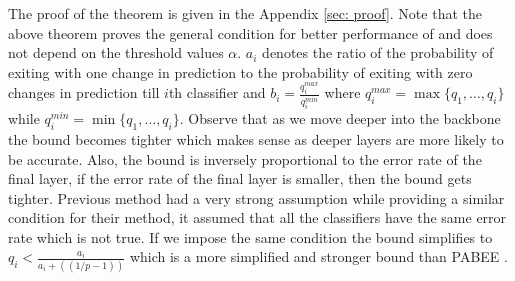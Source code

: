 The proof of the theorem is given in the Appendix \ref{sec: proof}. Note that the above theorem proves the general condition for better performance of \algo{} and does not depend on the threshold values $\alpha$. $a_i$ denotes the ratio of the probability of exiting with one change in prediction to the probability of exiting with zero changes in prediction till $i$th classifier and $b_i = \frac{q_i^{max}}{q_i^{min}}$ where $q_i^{max} = \max\{q_1, \ldots, q_i\}$ while $q_i^{min} = \min\{q_1, \ldots, q_i\}$. Observe that as we move deeper into the backbone the bound becomes tighter which makes sense as deeper layers are more likely to be accurate. Also, the bound is inversely proportional to the error rate of the final layer, if the error rate of the final layer is smaller, then the bound gets tighter. Previous method \cite{zhou2020bert} had a very strong assumption while providing a similar condition for their method, it assumed that all the classifiers have the same error rate which is not true. If we impose the same condition the bound simplifies to $q_i<\frac{a_i}{a_i+((1/p-1))}$ which is a more simplified and stronger bound than PABEE \citep{zhou2020bert}.


